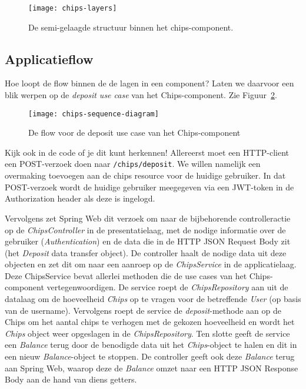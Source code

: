 \begin{figure}[H]
    \centering
    \texttt{[image: chips-layers]}
    \caption{De semi-gelaagde structuur binnen het chips-component.}
    \label{fig:chips-layers}
\end{figure}

\subsection{Applicatieflow}
Hoe loopt de flow binnen de de lagen in een component? 
Laten we daarvoor een blik werpen 
op de \emph{deposit use case} van het Chips-component.
Zie Figuur~\ref{fig:chips-sequence-diagram}.

\begin{figure}[H]
    \centering
    \texttt{[image: chips-sequence-diagram]}
    \caption{De flow voor de deposit use case van het Chips-component}
    \label{fig:chips-sequence-diagram}
\end{figure}

Kijk ook in de code of je dit kunt herkennen!
Allereerst moet een HTTP-client een POST-verzoek doen naar 
\texttt{/chips/deposit}. We willen namelijk een overmaking toevoegen
aan de chips resource voor de huidige gebruiker. In dat POST-verzoek 
wordt de huidige gebruiker meegegeven via een JWT-token in de Authorization header
als deze is ingelogd. 

Vervolgens zet Spring Web dit verzoek om naar de bijbehorende 
controlleractie op de \emph{ChipsController} in de presentatielaag, met de
nodige informatie over de gebruiker (\emph{Authentication}) en de data die 
in de HTTP JSON Request Body zit (het \emph{Deposit} data transfer object).
De controller haalt de nodige data uit deze objecten en zet dit om naar 
een aanroep op de \emph{ChipsService} in de applicatielaag. 
Deze ChipsService bevat allerlei methoden die de use cases van 
het Chips-component vertegenwoordigen.
De service roept de \emph{ChipsRepository} aan uit de datalaag om de hoeveelheid
\emph{Chips} op te vragen voor de betreffende \emph{User} (op basis van de username). 
Vervolgens roept de service de \emph{deposit}-methode aan op de Chips om het aantal chips te verhogen met de 
gekozen hoeveelheid en wordt het \emph{Chips} object weer opgeslagen in de \emph{ChipsRepository}.
Ten slotte geeft de service een \emph{Balance} terug door de benodigde data uit het 
\emph{Chips}-object te halen en dit in een nieuw \emph{Balance}-object te stoppen.
De controller geeft ook deze \emph{Balance} terug aan Spring Web, waarop deze de 
\emph{Balance} omzet naar een HTTP JSON Response Body aan de hand van diens getters.

